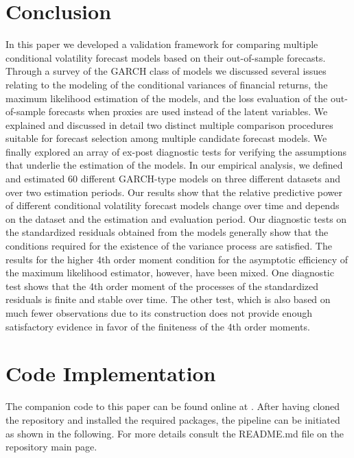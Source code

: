\documentclass{article} %
\begin{document}
	\section{Conclusion}\label{sec:conclusion}
	In this paper we developed a validation framework for comparing multiple conditional volatility forecast models based on their out-of-sample forecasts. Through a survey of the GARCH class of models we discussed several issues relating to the modeling of the conditional variances of financial returns, the maximum likelihood estimation of the models, and the loss evaluation of the out-of-sample forecasts when proxies are used instead of the latent variables. We explained and discussed in detail two distinct multiple comparison procedures suitable for forecast selection among multiple candidate forecast models. We finally explored an array of ex-post diagnostic tests for verifying the assumptions that underlie the estimation of the models. In our empirical analysis, we defined and estimated 60 different GARCH-type models on three different datasets and over two estimation periods. Our results show that the relative predictive power of different conditional volatility forecast models change over time and depends on the dataset and the estimation and evaluation period. Our diagnostic tests on the standardized residuals obtained from the models generally show that the conditions required for the existence of the variance process are satisfied. The results for the higher 4th order moment condition for the asymptotic efficiency of the maximum likelihood estimator, however, have been mixed. One diagnostic test shows that the 4th order moment of the processes of the standardized residuals is finite and stable over time. The other test, which is also based on much fewer observations due to its construction does not provide enough satisfactory evidence in favor of the finiteness of the 4th order moments.

\pagebreak
	
	\appendix
	\section{Code Implementation}\label{app:code_a}
	
	The companion code to this paper can be found online at \textcite{GITHUB}. After having cloned the repository and installed the required packages, the pipeline can be initiated as shown in the following. For more details consult the README.md file on the repository main page.
	
\end{document}
